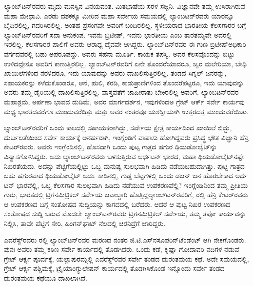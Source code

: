 ಲ್ಯಾಂಬ್​ಟನ್​ರವರು ಮೃದು ಮನಸ್ಸಿನ ವಿನಯವಂತ. ಮಿತಭಾಷೆಯ ಸರಳ ಸಜ್ಜನಿ. ವಿಜ್ಞಾನವೇ ತಮ್ಮ ಉಸಿರಾಗಿರುವ ಮಹಾ ಮೇಧಾವಿ. ಎರಡು ದಶಕಕ್ಕೂ ಮೀರಿದ ಮಹಾ ಸರ್ವೇಯ ಸಮಯದಲ್ಲಿ ಲ್ಯಾಂಬಟನ್​ರವರು ಯಾರನ್ನೂ ಬೈದಿರಲಿಲ್ಲ, ಗದರಿಸಿರಲಿಲ್ಲ. ಅಂತಹ ಪ್ರಸಂಗವೇ ಅವರಿಗೆ ಬಂದಿರಲಿಲ್ಲ. ಸ್ಥಳೀಯರಾದ ಭಾರತೀಯ ಕೆಲಸಗಾರರ ಬಗ್ಗೆ ಲ್ಯಾಂಬ್​ಟನ್​ರವರಿಗೆ ಸದಾ ಅನುಕಂಪ. ಇವನು ಬ್ರಿಟೀಷ್​, ಇವನು ಭಾರತೀಯ ಎಂಬ ತಾರತಮ್ಯವೇ ಅವರಲ್ಲಿ ಇರಲಿಲ್ಲ. ಕೆಲಸಗಾರರ ಪಾಲಿಗೆ ಅವರು ಆರಾಧ್ಯ ದೈವವೇ ಆಗಿದ್ದರು. ಲ್ಯಾಂಬ್​ಟನ್​ರವರ ಈ ಗುಣ ಬ್ರಿಟೀಷ್​ ಅಧಿಕಾರಿ ವರ್ಗದವರಲ್ಲಿ ಬಹು ಅಪರೂಪದ್ದು. ಅವರು ಸಹನಾ ಮೂರ್ತಿ. ಕಾಯಕ ತಪಸ್ವಿ. ಅವರ ಕೆಲಸವೊಂದನ್ನು ಬಿಟ್ಟು ಉಳಿದದ್ದೇನೂ ಅವರಿಗೆ ಕಾಣುತ್ತಿರಲಿಲ್ಲ. ಲ್ಯಾಂಬ್​ಟನ್​ರವರಿಗೆ ಏನೇ ತೊಂದರೆಯಾದರೂ, ಜ್ವರ ಮಲೇರಿಯಾ, ಬೇಧಿ ಖಾಯಿಲೆಗಳಿಂದ ನರಳಿದರೂ, ಇದು ಯಾವುದನ್ನು ಅವರು ದಾಖಲಿಸುತ್ತಿರಲಿಲ್ಲ. ತಂಡದ ಸಿಗ್ನಲ್​ ಜನರನ್ನು, ಸಹಾಯಕರನ್ನು ಕಳೆದುಕೊಂಡರೂ, ಆನೆ, ಹುಲಿ, ಕರಡಿ, ಕಾಡುಪ್ರಾಣಿಗಳಿಂದ ತೊಂದರೆಪಟ್ಟರೂ, ಇದು ಯಾವುದನ್ನು ಅವರು ತಮ್ಮ ಡೈರಿಯಲ್ಲಿ ದಾಖಲಿಸುತ್ತಿರಲಿಲ್ಲ. ವಾಸ್ತವತೆಗೆ ಜಾಹೀರಾತು ಬೇಕಿರಲಿಲ್ಲ ಅವರಿಗೆ. ಲ್ಯಾಂಬಟನ್​ರವರ ಮಹಾಶ್ರಮ, ಅರ್ಪಣಾ ಭಾವದ ದುಡಿಮೆ, ಅವರ ಮಾರ್ಗದರ್ಶನ, ಇವುಗಳಿಂದಅ ಗ್ರೇಟ್​ ಆರ್ಕ್ ಸರ್ವೇ ಕಾರ್ಯವು ಮಧ್ಯ ಭಾರತದವರೆಗೂ ಮುಂದುವರೆದಿತ್ತು ಮತ್ತು ಅವರ ನಂತರವೂ ಯಶಸ್ವೀಯಾಗಿ ಉತ್ತರದತ್ತ ಮುಂದುವರೆಯಿತು.

ಲ್ಯಾಂಬ್​ಟನ್​ರವರಿಗೆ ಒಂದು ಕಾಲದಲ್ಲಿ ಸಹಾಯಕರಾಗಿದ್ದು, ಸರ್ವೇಯ ಕ್ಷೇತ್ರ ಕಾರ್ಯದಿಂದ ಖಾಯಿಲೆ ಬಿದ್ದು, ದುರ್ಬಲತೆಯಿಂದ ಸರ್ವೇ ಕಾರ್ಯಕ್ಕೆ ಅನರ್ಹರಾಗಿ, ಇಂಗ್ಲೆಂಡಿಗೆ ವಾಪಾಸು ಹೋಗಿದ್ದವರು ಪ್ರಸಿದ್ಧ ಭೌತ ವಿಜ್ಞಾನಿ ಹೆನ್ರಿ ಕೇಟರ್​ರವರು. ಅವರು ಇಂಗ್ಲೆಂಡಿನಲ್ಲಿ, ಹೊಸದಾಗಿ ಒಂದು ಪುಟ್ಟ ಗಾತ್ರದ ಹಗುರ ಥಿಯಡೋಲೈಟ್​ನ್ನು ವಿನ್ಯಾಸಗೊಳಿಸಿದ್ದರು. ಅದು ಲ್ಯಾಂಬ್​ಟನ್​ರವರು ಬಳಸುತ್ತಿರುವ ಅರ್ಧಟನ್​ ಭಾರದ, ಮಹಾ ಥಿಯಡೋಲೈಟ್​\-ನಷ್ಟೇ ನಿಖರತೆಯದು. ಅದನ್ನು ಪೆಟ್ಟಿಗೆಯಲ್ಲಿಟ್ಟು ಒಬ್ಬ ಮನುಷ್ಯ ಸುಲಭವಾಗಿ ಹಿಡಿದು ನಡೆಯಬಹುದಾಗಿತ್ತು. ಪುಟ್ಟ ಗಾತ್ರದ ಬಹು ಹಗುರವಾದ ಥಿಯಡೋಲೈಟ್​ ಅದು. ಕಾಡಿನಲ್ಲಿ, ಗುಡ್ಡ ಬೆಟ್ಟಗಳಲ್ಲಿ ಒಂದು ಡಜನ್​ ಜನ ಹೊರಬೇಕಾದ ಅರ್ಧ ಟನ್​ ಭಾರವೆಲ್ಲಿ, ಒಬ್ಬ ಕೆಲಸಗಾರ ಸುಲಭವಾಗಿ ಹಿಡಿದು ನಡೆಯುವ ಉಪಕರಣವೆಲ್ಲಿ? ಇಂಗ್ಲೆಂಡಿನಿಂದ ತಮ್ಮ ಪ್ರೀತಿಯ ಗುರು, ಭಾರತದಲ್ಲಿ ಟ್ರಿಗನಮಿಟ್ರಿಕಲ್​ ಸರ್ವೇಯ ಜವಾಬ್ದಾರಿ ಹೊತ್ತಿದ್ದ\break ಲ್ಯಾಂಬ್​ಟನ್​ರವರಿಗೆ, ರಲ್ಲಿ ಹೆನ್ರಿ ಕೇಟರ್​ರವರು ಆ ಉಪಕರಣದ ಬಗ್ಗೆ ಸಂತೋಷದ ಸುದ್ದಿಯನ್ನು ಕಾಗದದಲ್ಲಿ ಬರೆದರು. ಆದರೆ ಆ ಪುಟ್ಟ ನಿಖರ ಉಪಕರಣದ ಸಂತೋಷದ ಸುದ್ದಿ ಬರುವ ಮೊದಲೇ ಲ್ಯಾಂಬ್​ಟನ್​ರವರು ಟ್ರಿಗನಮಿಟ್ರಿಕಲ್​ ಸರ್ವೇಯ, ತಮ್ಮ ತಪೋ ಕಾರ್ಯವನ್ನು ನಿಲ್ಲಿಸಿ, ತಾವೇ ಪೆಟ್ಟಿಗೆ ಸೇರಿ, ಹಿಂಗನ್​ಘಾಟ್​ ನೆಲದಲ್ಲಿ ಚಿರನಿದ್ರೆಗೆ ಜಾರಿದ್ದರು.

ಎವರೆಸ್ಟ್​ರವರು ರಲ್ಲಿ ಲ್ಯಾಂಬ್​ಟನ್​ರವರ ಮರಣದ ನಂತರ ಜಿ.ಟಿ.ಎಸ್​ನ\break ಸೂಪರಿನ್​ಟೆಂಡೆಂಟ್​ ಆಗಿ ನೇಕಗೊಂಡರು. ಪುನಃ ಅವರು ತಮ್ಮ ಕಠಿಣ ಸರ್ವೇ ಕಾರ್ಯದಲ್ಲಿ ತೊಡಗಿದರು. ಒಂದು ಕಡೆ, ಕೃಷ್ಣಾ ಗೋದಾವರಿ ನದಿಗಳ ನಡುವೆ ಗ್ರೇಟ್​ ಆರ್ಕ್ನ ಪೂರ್ವಕ್ಕೆ, ಯಲ್ಲಾಪುರಮ್ನಲ್ಲಿ ಎವರೆಸ್ಟ್​ರವರ ಸರ್ವೇ ತಂಡದ ದುರಂತಮಯ ಕಥೆ. ಅದೇ ಸಮಯದಲ್ಲಿ, ಗ್ರೇಟ್​ ಆರ್ಕ್ನ ಪಶ್ಚಿಮಕ್ಕೆ, ಟ್ರೈಯಾಂಗ್ಯುಲೇಷನ್​ ಕಾರ್ಯದಲ್ಲಿ ತೊಡಗಿಸಿಕೊಂಡ ಇನ್ನೊಂದು ಸರ್ವೇ ತಂಡದ ದುರಂತಮಯ ಕಥೆಯೂ ದಾಖಲಾಗಿದೆ.

